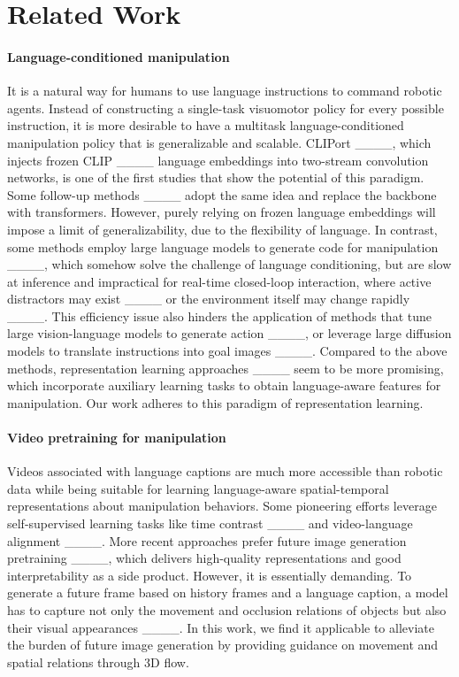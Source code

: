 \section{Related Work}
\label{sec:relat}

\paragraph{Language-conditioned manipulation}
It is a natural way for humans to use language instructions to command robotic agents. Instead of constructing a single-task visuomotor policy for every possible instruction, it is more desirable to have a multitask language-conditioned manipulation policy that is generalizable and scalable. CLIPort ____, which injects frozen CLIP ____ language embeddings into two-stream convolution networks, is one of the first studies that show the potential of this paradigm. Some follow-up methods ____ adopt the same idea and replace the backbone with transformers. However, purely relying on frozen language embeddings will impose a limit of generalizability, due to the flexibility of language. In contrast, some methods employ large language models to generate code for manipulation ____, which somehow solve the challenge of language conditioning, but are slow at inference and impractical for real-time closed-loop interaction, where active distractors may exist ____ or the environment itself may change rapidly ____. This efficiency issue also hinders the application of methods that tune large vision-language models to generate action ____, or leverage large diffusion models to translate instructions into goal images ____. Compared to the above methods, representation learning approaches ____ seem to be more promising, which incorporate auxiliary learning tasks to obtain language-aware features for manipulation. Our work adheres to this paradigm of representation learning.

\paragraph{Video pretraining for manipulation}
Videos associated with language captions are much more accessible than robotic data while being suitable for learning language-aware spatial-temporal representations about manipulation behaviors. Some pioneering efforts leverage self-supervised learning tasks like time contrast ____ and video-language alignment ____. More recent approaches prefer future image generation pretraining ____, which delivers high-quality representations and good interpretability as a side product. However, it is essentially demanding. To generate a future frame based on history frames and a language caption, a model has to capture not only the movement and occlusion relations of objects but also their visual appearances ____. In this work, we find it applicable to alleviate the burden of future image generation by providing guidance on movement and spatial relations through 3D flow.


